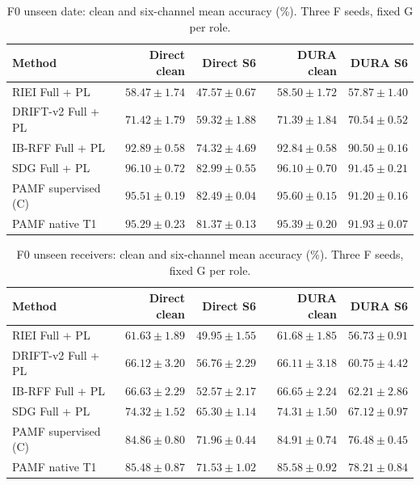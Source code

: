 \begin{table}[t]\centering\small
\setlength{\tabcolsep}{5pt}\renewcommand{\arraystretch}{1.15}
\caption{F0 unseen date: clean and six-channel mean accuracy (\%). Three F seeds, fixed G per role.}
\begin{tabular*}{\textwidth}{@{\extracolsep{\fill}}lrrrr@{}}\toprule
Method & Direct clean & Direct S6 & DURA clean & DURA S6\\\midrule
RIEI Full + PL & $58.47\pm1.74$ & $47.57\pm0.67$ & $58.50\pm1.72$ & $57.87\pm1.40$\\
DRIFT-v2 Full + PL & $71.42\pm1.79$ & $59.32\pm1.88$ & $71.39\pm1.84$ & $70.54\pm0.52$\\
IB-RFF Full + PL & $92.89\pm0.58$ & $74.32\pm4.69$ & $92.84\pm0.58$ & $90.50\pm0.16$\\
SDG Full + PL & $96.10\pm0.72$ & $82.99\pm0.55$ & $96.10\pm0.70$ & $91.45\pm0.21$\\
PAMF supervised (C) & $95.51\pm0.19$ & $82.49\pm0.04$ & $95.60\pm0.15$ & $91.20\pm0.16$\\
PAMF native T1 & $95.29\pm0.23$ & $81.37\pm0.13$ & $95.39\pm0.20$ & $91.93\pm0.07$\\
\bottomrule\end{tabular*}\end{table}

\begin{table}[t]\centering\small
\setlength{\tabcolsep}{5pt}\renewcommand{\arraystretch}{1.15}
\caption{F0 unseen receivers: clean and six-channel mean accuracy (\%). Three F seeds, fixed G per role.}
\begin{tabular*}{\textwidth}{@{\extracolsep{\fill}}lrrrr@{}}\toprule
Method & Direct clean & Direct S6 & DURA clean & DURA S6\\\midrule
RIEI Full + PL & $61.63\pm1.89$ & $49.95\pm1.55$ & $61.68\pm1.85$ & $56.73\pm0.91$\\
DRIFT-v2 Full + PL & $66.12\pm3.20$ & $56.76\pm2.29$ & $66.11\pm3.18$ & $60.75\pm4.42$\\
IB-RFF Full + PL & $66.63\pm2.29$ & $52.57\pm2.17$ & $66.65\pm2.24$ & $62.21\pm2.86$\\
SDG Full + PL & $74.32\pm1.52$ & $65.30\pm1.14$ & $74.31\pm1.50$ & $67.12\pm0.97$\\
PAMF supervised (C) & $84.86\pm0.80$ & $71.96\pm0.44$ & $84.91\pm0.74$ & $76.48\pm0.45$\\
PAMF native T1 & $85.48\pm0.87$ & $71.53\pm1.02$ & $85.58\pm0.92$ & $78.21\pm0.84$\\
\bottomrule\end{tabular*}\end{table}

